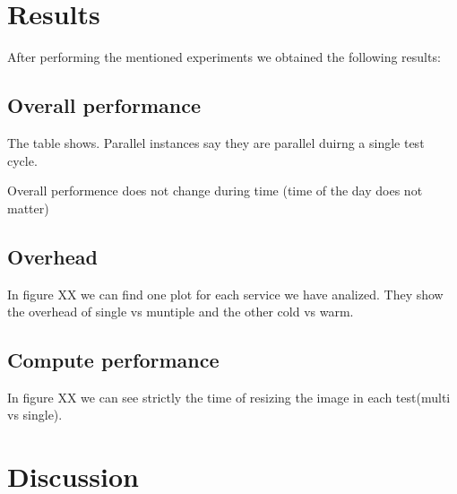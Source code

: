 \documentclass[11pt]{article}
\begin{document}
 




\section{Results}
After performing the mentioned experiments we obtained the following results:



\subsection{Overall performance}

The table shows. Parallel instances say they are parallel duirng a single test cycle.


Overall performence does not change during time (time of the day does not matter)

\subsection{Overhead}

In figure XX we can find one plot for each service we have analized. They show the overhead of single vs muntiple and the other cold vs warm.




\subsection{Compute performance}

In figure XX we can see strictly the time of resizing the image in each test(multi vs single).




\section{Discussion}
\end{document}
